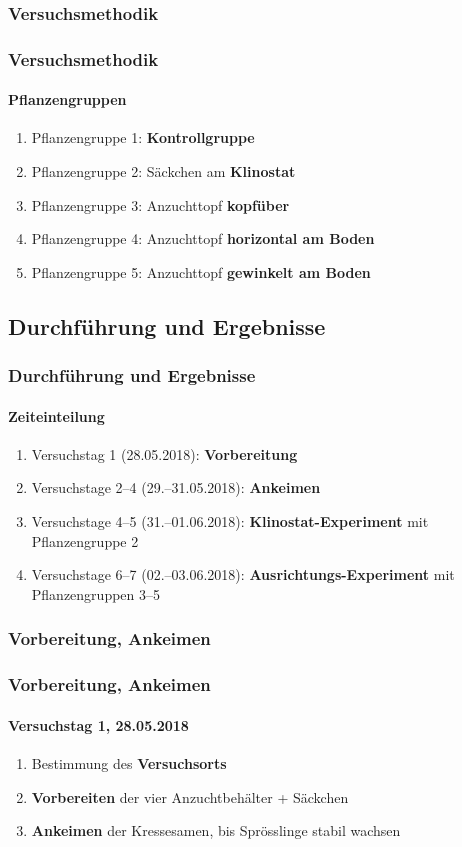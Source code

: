 \documentclass[aspectratio=169
]{beamer}
\begin{document}
	\subsubsection{Versuchsmethodik}
	
	\begin{frame}[<+(1)->]
		\frametitle{Versuchsmethodik}
		\framesubtitle{Pflanzengruppen}
\begin{enumerate}
\item Pflanzengruppe 1: \textbf{Kontrollgruppe}
\item Pflanzengruppe 2: Säckchen am \textbf{Klinostat}
\item Pflanzengruppe 3: Anzuchttopf \textbf{kopfüber}
\item Pflanzengruppe 4: Anzuchttopf \textbf{horizontal am Boden}
\item Pflanzengruppe 5: Anzuchttopf \textbf{gewinkelt am Boden} 
\end{enumerate}
		
	\end{frame}
	
\subsection{Durchführung und Ergebnisse}
	
\begin{frame}[<+(1)->]
\frametitle{Durchführung und Ergebnisse}
\framesubtitle{Zeiteinteilung}
		
\begin{enumerate}
\item Versuchstag 1 (28.05.2018): \textbf{Vorbereitung}
\item Versuchstage 2--4 (29.--31.05.2018): \textbf{Ankeimen}
\item Versuchstage 4--5 (31.--01.06.2018): \textbf{Klinostat-Experiment} mit Pflanzengruppe 2
\item Versuchstage 6--7 (02.--03.06.2018): \textbf{Ausrichtungs-Experiment} mit Pflanzengruppen 3--5
\end{enumerate}
\end{frame}
	
\subsubsection{Vorbereitung, Ankeimen}

\begin{frame}[<+(1)->]
\frametitle{Vorbereitung, Ankeimen}
\framesubtitle{Versuchstag 1, 28.05.2018}
		
\begin{enumerate}
\item Bestimmung des \textbf{Versuchsorts}
\item \textbf{Vorbereiten} der vier Anzuchtbehälter + Säckchen 
\item \textbf{Ankeimen} der Kressesamen, bis Sprösslinge stabil wachsen
\end{enumerate}
\end{frame}
	
\end{document}
